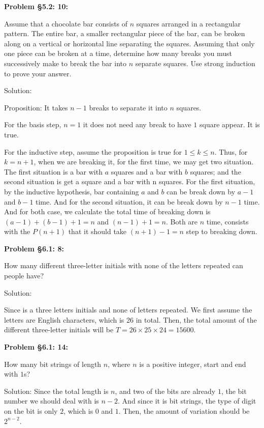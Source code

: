 \documentclass{article}
\newenvironment{problem}[1]
{\begin{mdframed}[default]
\textbf{Problem #1:}
}
{\end{mdframed}
}
\begin{document}
\begin{problem}{\S 5.2: 10}
Assume that a chocolate bar consists of $n$ squares arranged in a rectangular
pattern. The entire bar, a smaller rectangular piece of the bar, can be broken
along on a vertical or horizontal line separating the squares. Assuming that only
one piece can be broken at a time, determine how many breaks you must successively
make to break the bar into $n$ separate squares. Use strong induction to prove your
answer.\newline

Solution:

Proposition: It takes $n-1$ breaks to separate it into $n$ squares. 

For the basis step, $n=1$ it does not need any break to have $1$ square appear. It is true.

For the inductive step, assume the proposition is true for $1\leq k\leq n$. Thus, for $k=n+1$, when we are breaking it, for the first time, we may get two situation.
The first situation is a bar with $a$ squares and a bar with $b$ squares; and the second situation is get a square and a bar with n squares.
For the first situation, by the inductive hypothesis, bar containing $a$ and $b$ can be break down by $a-1$ and $b-1$ time. And for the second situation, it can be break down by $n-1$ time.
And for both case, we calculate the total time of breaking down is $(a-1)+(b-1)+1=n$ and $(n-1)+1=n$.
Both are $n$ time, consists with the $P(n+1)$ that it should take $(n+1)-1=n$ step to breaking down.

\end{problem}
\begin{problem}{\S 6.1: 8}
How many different three-letter initials with none of the letters repeated can
people have?

Solution:

Since is a three letters initials and none of letters repeated. We first assume the letters are English characters, which is 26 in total.
Then, the total amount of the different three-letter initials will be $T=26\times25\times24=15600$.
\end{problem}
\begin{problem}{\S 6.1: 14}
How many bit strings of length $n$, where $n$ is a positive integer, start and end
with $1$s?

Solution:
Since the total length is $n$, and two of the bits are already $1$, the bit number we should deal with is $n-2$. And since it is bit strings, the type of digit on the bit is only $2$, which is $0$ and $1$.
Then, the amount of variation should be $2^{n-2}$.

\end{problem}
\end{document}
